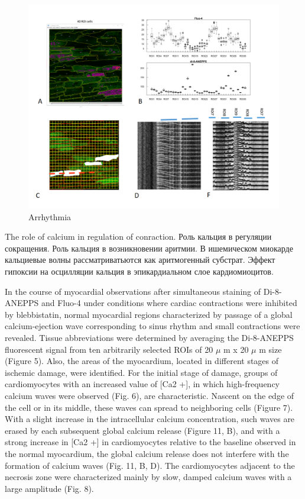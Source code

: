 \documentclass[a4paper,12pt]{article}
\begin{document}
\begin{figure}
    \includegraphics[width=\linewidth]{fig2.png}
    \caption{Arrhythmia}
    \label{fig:fig2}
\end{figure}

The role of calcium in regulation of conraction.
Роль кальция в регуляции сокращения.
Роль кальция в  возникновении аритмии.
В ишемическом миокарде кальциевые волны рассматриватьются как аритмогенный субстрат.
Эффект гипоксии на осцилляции кальция в эпикардиальном слое кардиомиоцитов.

In the course of myocardial observations after simultaneous staining of Di-8-ANEPPS and Fluo-4 under conditions where cardiac contractions were inhibited by blebbistatin, normal myocardial regions characterized by passage of a global calcium-ejection wave corresponding to sinus rhythm and small contractions were revealed. Tissue abbreviations were determined by averaging the Di-8-ANEPPS fluorescent signal from ten arbitrarily selected ROIs of 20 $\mu$ m x 20 $\mu$ m size (Figure 5). Also, the areas of the myocardium, located in different stages of ischemic damage, were identified. For the initial stage of damage, groups of cardiomyocytes with an increased value of [Ca2 +], in which high-frequency calcium waves were observed (Fig. 6), are characteristic. Nascent on the edge of the cell or in its middle, these waves can spread to neighboring cells (Figure 7). With a slight increase in the intracellular calcium concentration, such waves are erased by each subsequent global calcium release (Figure 11, B), and with a strong increase in [Ca2 +] in cardiomyocytes relative to the baseline observed in the normal myocardium, the global calcium release does not interfere with the formation of calcium waves (Fig. 11, B, D). The cardiomyocytes adjacent to the necrosis zone were characterized mainly by slow, damped calcium waves with a large amplitude (Fig. 8).
\end{document}
